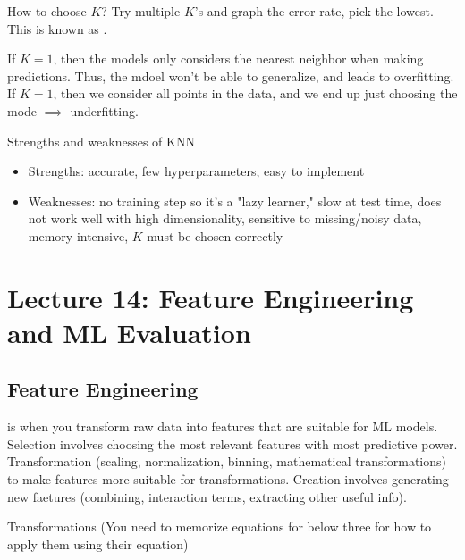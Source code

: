 \documentclass[12pt]{scrartcl}
\begin{document}
\begin{note}
  How to choose $K$? Try multiple $K$'s and graph the error rate, pick the lowest. This is 
  known as .
\end{note}

\begin{note}
  If $K = 1$, then the models only considers the nearest neighbor when making predictions. Thus, the mdoel won't be able to generalize,
  and leads to overfitting. If $K = 1$, then we consider all points in the data, and we end up just choosing the mode $\implies$ underfitting.
\end{note}

\begin{note}
  Strengths and weaknesses of KNN

  \begin{itemize}
    \item Strengths: accurate, few hyperparameters, easy to implement
    \item Weaknesses: no training step so it's a "lazy learner," slow at test time, does not work well with high dimensionality, sensitive to missing/noisy data, memory intensive, $K$ must be chosen correctly
  \end{itemize}
\end{note}

\section{Lecture 14: Feature Engineering and ML Evaluation}

\subsection{Feature Engineering}

\begin{definition}
   is when you transform raw data into features 
  that are suitable for ML models. Selection involves choosing the most relevant features with most 
  predictive power. Transformation (scaling, normalization, binning, mathematical transformations) to make features 
  more suitable for transformations. Creation involves generating new faetures (combining, interaction terms, extracting other useful info).
\end{definition}

Transformations (You need to memorize equations for below three for how to apply them using their equation)
\end{document}

